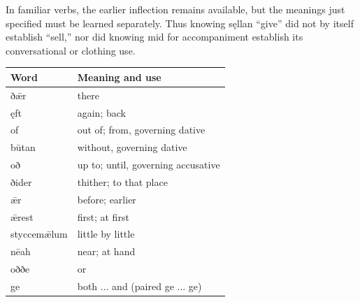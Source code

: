 In familiar verbs, the earlier inflection remains available, but the meanings just specified must be learned separately. Thus knowing sęllan “give” did not by itself establish “sell,” nor did knowing mid for accompaniment establish its conversational or clothing use.

\par\begingroup
\fontsize{10.5}{13.2}\selectfont
\setlength{\LTleft}{0pt}\setlength{\LTright}{\fill}
\noindent
\begin{tabular}{@{}>{\raggedright\arraybackslash}p{41.92mm}>{\raggedright\arraybackslash}p{79.27mm}@{}}
\toprule
\textbf{Word} & \textbf{Meaning and use} \\
\midrule
ðǣr & there \\
ęft & again; back \\
of & out of; from, governing dative \\
būtan & without, governing dative \\
oð & up to; until, governing accusative \\
ðider & thither; to that place \\
ǣr & before; earlier \\
ǣrest & first; at first \\
styccemǣlum & little by little \\
nēah & near; at hand \\
oððe & or \\
ge & both ... and (paired ge ... ge) \\
\bottomrule
\end{tabular}
\par\endgroup

